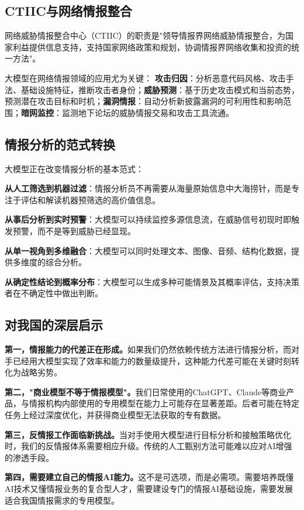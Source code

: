 \subsection{CTIIC与网络情报整合}

网络威胁情报整合中心（CTIIC）的职责是"领导情报界网络威胁情报整合，为国家利益提供信息支持，支持国家网络政策和规划，协调情报界网络收集和投资的统一方法"。

大模型在网络情报领域的应用尤为关键：
\textbf{攻击归因}：分析恶意代码风格、攻击手法、基础设施特征，推断攻击者身份；\textbf{威胁预测}：基于历史攻击模式和当前态势，预测潜在攻击目标和时机；\textbf{漏洞情报}：自动分析新披露漏洞的可利用性和影响范围；\textbf{暗网监控}：监测地下论坛的威胁情报交易和攻击工具流通。

\subsection{情报分析的范式转换}

大模型正在改变情报分析的基本范式：

\textbf{从人工筛选到机器过滤}：情报分析员不再需要从海量原始信息中大海捞针，而是专注于评估和解读机器预筛选的高价值信息。

\textbf{从事后分析到实时预警}：大模型可以持续监控多源信息流，在威胁信号初现时即触发预警，而不是等到威胁已经显现。

\textbf{从单一视角到多维融合}：大模型可以同时处理文本、图像、音频、结构化数据，提供多维度的综合分析。

\textbf{从确定性结论到概率分布}：大模型可以生成多种可能情景及其概率评估，支持决策者在不确定性中做出判断。

\subsection{对我国的深层启示}

\textbf{第一，情报能力的代差正在形成。}如果我们仍然依赖传统方法进行情报分析，而对手已经用大模型实现了效率和能力的数量级提升，这种能力代差可能在关键时刻转化为战略劣势。

\textbf{第二，"商业模型不等于情报模型"。}我们日常使用的ChatGPT、Claude等商业产品，与情报机构内部使用的专用模型在能力上可能存在显著差距。后者可能在特定任务上经过深度优化，并获得商业模型无法获取的专有数据。

\textbf{第三，反情报工作面临新挑战。}当对手使用大模型进行目标分析和接触策略优化时，我们的反情报体系需要相应升级。传统的人工甄别方法可能难以应对AI增强的渗透手段。

\textbf{第四，需要建立自己的情报AI能力。}这不是可选项，而是必需项。需要培养既懂AI技术又懂情报业务的复合型人才，需要建设专门的情报AI基础设施，需要发展适合我国情报需求的专用模型。

